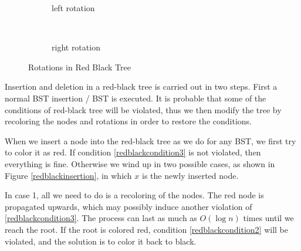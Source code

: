 \begin{figure}[ht]
\begin{subfigure}{\textwidth}
\centering
{}
\caption{left rotation}
\end{subfigure}\\
\begin{subfigure}{\textwidth}
\centering
{}
\caption{right rotation}
\end{subfigure}
\caption{Rotations in Red Black Tree}\label{rotations}
\end{figure}

Insertion and deletion in a red-black tree is carried out in two steps. First a normal BST insertion / BST is executed. It is probable that some of the conditions of red-black tree will be violated, thus we then modify the tree by recoloring the nodes and rotations in order to restore the conditions.

When we insert a node into the red-black tree as we do for any BST, we first try to color it as red. If condition \ref{redblackcondition3} is not violated, then everything is fine. Otherwise we wind up in two possible cases, as shown in Figure \ref{redblackinsertion}, in which $x$ is the newly inserted node. 

In case 1, all we need to do is a recoloring of the nodes. The red node is propagated upwards, which may possibly induce another violation of \ref{redblackcondition3}. The process can last as much as $O(\log n)$ times until we reach the root. If the root is colored red, condition \ref{redblackcondition2} will be violated, and the solution is to color it back to black. 

